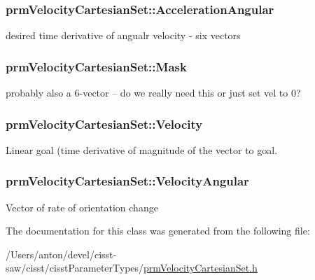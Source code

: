 \subsubsection[{Acceleration\+Angular}]{ prm\+Velocity\+Cartesian\+Set\+::\+Acceleration\+Angular\hspace{0.3cm}{\ttfamily [protected]}}\label{classprm_velocity_cartesian_set_a8a5727216f0caf109547c0cfd3ae6e43}
desired time derivative of angualr velocity -\/ six vectors \hypertarget{classprm_velocity_cartesian_set_aac00bb3d01fc051ac28f1ae32e06cfab}{}
\subsubsection[{Mask}]{ prm\+Velocity\+Cartesian\+Set\+::\+Mask\hspace{0.3cm}{\ttfamily [protected]}}\label{classprm_velocity_cartesian_set_aac00bb3d01fc051ac28f1ae32e06cfab}
probably also a 6-\/vector -- do we really need this or just set vel to 0? \hypertarget{classprm_velocity_cartesian_set_a8cc967fe13fe3167899f35394ef46dd0}{}
\subsubsection[{Velocity}]{ prm\+Velocity\+Cartesian\+Set\+::\+Velocity\hspace{0.3cm}{\ttfamily [protected]}}\label{classprm_velocity_cartesian_set_a8cc967fe13fe3167899f35394ef46dd0}
Linear goal (time derivative of magnitude of the vector to goal. \hypertarget{classprm_velocity_cartesian_set_a9d72325c32e55acfe48be69131f34fc3}{}
\subsubsection[{Velocity\+Angular}]{ prm\+Velocity\+Cartesian\+Set\+::\+Velocity\+Angular\hspace{0.3cm}{\ttfamily [protected]}}\label{classprm_velocity_cartesian_set_a9d72325c32e55acfe48be69131f34fc3}
Vector of rate of orientation change 

The documentation for this class was generated from the following file\+:\begin{DoxyCompactItemize}
\item 
/\+Users/anton/devel/cisst-\/saw/cisst/cisst\+Parameter\+Types/\hyperlink{prm_velocity_cartesian_set_8h}{prm\+Velocity\+Cartesian\+Set.\+h}\end{DoxyCompactItemize}
